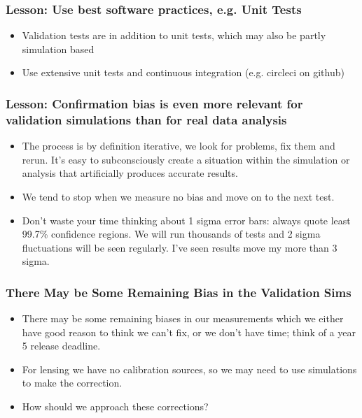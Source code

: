 \documentclass{beamer}
\begin{document}
\frame
{
    \frametitle{Lesson: Use best software practices, e.g. Unit Tests}

    \begin{itemize}

        \item Validation tests are in addition to unit tests, which may also be
            partly simulation based

        \item Use extensive unit tests and continuous integration (e.g. circleci
            on github)

    \end{itemize}

}

\frame
{

    \frametitle{Lesson: Confirmation bias is even more relevant for validation
    simulations than for real data analysis }


    \begin{itemize}

        \item The process is by definition iterative, we look for problems, fix
            them and rerun.  It's easy to subconsciously create a situation
            within the simulation or analysis that artificially produces
            accurate results.

        \item We tend to stop when we measure no bias and move on to the next
            test.

        \item Don't waste your time thinking about 1 sigma error bars:  always
            quote least 99.7\% confidence regions.  We will run thousands of
            tests and 2 sigma fluctuations will be seen regularly. I've
            seen results move my more than 3 sigma.

    \end{itemize}

}

\frame
{

    \frametitle{There May be Some Remaining Bias in the Validation Sims}

    \begin{itemize}

        \item There may be some remaining biases in our measurements which we
            either have good reason to think we can't fix, or we don't
            have time; think of a year 5 release deadline.

        \item For lensing we have no calibration sources, so we may need to use
            simulations to make the correction.

        \item How should we approach these corrections?

    \end{itemize}

}
\end{document}
